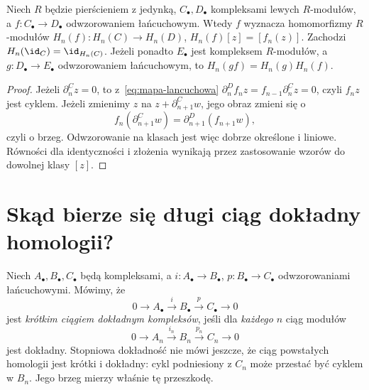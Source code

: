 \begin{stwierdzenie}
\label{prop:homologia-funktor}
Niech $R$ będzie pierścieniem z jedynką,
$C_\bullet,D_\bullet$ kompleksami lewych $R$-modułów,
a $f:C_\bullet\to D_\bullet$ odwzorowaniem łańcuchowym.
Wtedy $f$ wyznacza homomorfizmy $R$-modułów
$H_n(f):H_n(C)\to H_n(D)$,
$H_n(f)[z]=[f_n(z)]$. Zachodzi
$H_n(\id_C)=\id_{H_n(C)}$.
Jeżeli ponadto $E_\bullet$ jest kompleksem
$R$-modułów, a $g:D_\bullet\to E_\bullet$
odwzorowaniem łańcuchowym, to
$H_n(gf)=H_n(g)H_n(f)$.
\end{stwierdzenie}
\begin{proof}
Jeżeli $\partial^C_n z=0$, to z~\eqref{eq:mapa-lancuchowa}
$\partial^D_n f_nz=f_{n-1}\partial^C_nz=0$, czyli
$f_nz$ jest cyklem. Jeżeli zmienimy
$z$ na $z+\partial^C_{n+1}w$, jego obraz zmieni się o
\[
 f_n(\partial^C_{n+1}w)
 =\partial^D_{n+1}(f_{n+1}w),
\]
czyli o brzeg. Odwzorowanie na klasach jest więc
dobrze określone i liniowe.
Równości dla identyczności i złożenia
wynikają przez zastosowanie wzorów
do dowolnej klasy $[z]$.
\end{proof}

\section{Skąd bierze się długi ciąg dokładny homologii?}
\label{sec:dlugi-ciag-homologii}

Niech $A_\bullet,B_\bullet,C_\bullet$ będą
kompleksami, a $i:A_\bullet\to B_\bullet$,
$p:B_\bullet\to C_\bullet$ odwzorowaniami łańcuchowymi.
Mówimy, że
\[
 0\longrightarrow A_\bullet
 \xrightarrow{i}B_\bullet
 \xrightarrow{p}C_\bullet
 \longrightarrow0
\]
jest \emph{krótkim ciągiem dokładnym kompleksów},
jeśli dla \emph{każdego} $n$ ciąg modułów
\begin{equation}\label{eq:ses-kompleks}
 0\longrightarrow A_n\xrightarrow{i_n}B_n
 \xrightarrow{p_n}C_n\longrightarrow0
\end{equation}
jest dokładny. Stopniowa dokładność nie
mówi jeszcze, że ciąg powstałych homologii
jest krótki i dokładny: cykl podniesiony
z $C_n$ może przestać być cyklem w $B_n$.
Jego brzeg mierzy właśnie tę przeszkodę.

